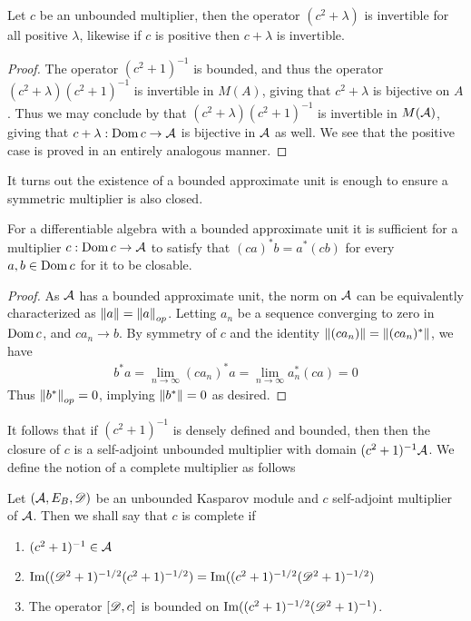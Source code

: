\begin{lemma}
	Let $c$ be an unbounded multiplier, then the operator $(c^2+\lambda)$ is invertible for all positive $\lambda$, likewise if $c$ is positive then $c+\lambda$ is invertible. 
\end{lemma}
\begin{proof}
	The operator $(c^2+1)^{-1}$ is bounded, and thus the operator $(c^2+\lambda)(c^2+1)^{-1}$ is invertible in $M(A)$, giving that $c^2+\lambda$ is bijective on $A$. Thus we may conclude by  that $(c^2+\lambda)(c^2+1)^{-1}$ is invertible in $M(\mathcal{A})$, giving that $c+\lambda:\operatorname{Dom} c\to \mathcal{A}$ is bijective in $\mathcal{A}$ as well. We see that the positive case is proved in an entirely analogous manner. 
\end{proof}
It turns out the existence of a bounded approximate unit is enough to ensure a symmetric multiplier is also closed. 
\begin{lemma}
	For a differentiable algebra with a bounded approximate unit it is sufficient for a multiplier $c:\operatorname{Dom} c \to \mathcal{A}$ to satisfy that $(ca)^*b=a^*(cb)$ for every $a,b\in \operatorname{Dom} c$ for it to be closable. 
\end{lemma}
\begin{proof}
	As $\mathcal{A}$ has a bounded approximate unit, the norm on $\mathcal{A}$ can be equivalently characterized as $\left \Vert a \right \Vert=\left \Vert a \right \Vert_{op}$. Letting $a_n$ be a sequence converging to zero in $\operatorname{Dom} c$, and $ca_n\to b$. By symmetry of $c$ and the identity $\left \Vert (ca_n) \right \Vert=\left \Vert (ca_n)^* \right \Vert$, we have 
	\begin{align*}
		b^*a=\lim_{n\to \infty} (ca_n)^* a=\lim_{n\to \infty} a^*_n(ca)=0
	\end{align*}
	Thus $\left \Vert b^* \right \Vert_{op}=0$, implying $\left \Vert b^* \right \Vert=0$ as desired. 
\end{proof}
It follows that if $(c^2+1)^{-1}$ is densely defined and bounded, then then the closure of $c$ is a self-adjoint unbounded multiplier with domain $(c^2+1)^{-1}\mathcal{A}$. We define the notion of a complete multiplier as follows 
\begin{definition}
	Let $(\mathcal{A},E_B,\mathscr{D})$ be an unbounded Kasparov module and $c$ self-adjoint multiplier of $\mathcal{A}$. Then we shall say that $c$ is complete if 
\begin{enumerate}
\item 
	$	(c^2+1)^{-1}\in \mathcal{A}$ 
\item
		$\operatorname{Im}((\mathscr{D}^2+1)^{-1/2}(c^2+1)^{-1/2})=\operatorname{Im}((c^2+1)^{-1/2}(\mathscr{D}^2+1)^{-1/2})$
\item 
		The operator $[\mathscr{D},c]$ is bounded on $\operatorname{Im}((c^2+1)^{-1/2}(\mathscr{D}^2+1)^{-1})$. 
\end{enumerate}
\end{definition}
